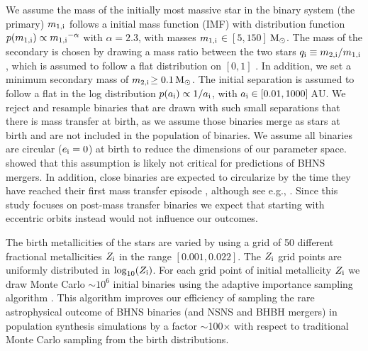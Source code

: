 \documentclass[twocolumn]{aastex63}
\newcommand\bhnsSingle{BHNS\xspace}
\newcommand{\monei}{\ensuremath{m_{1,\rm{i}}}\xspace}
\newcommand{\mtwoi}{\ensuremath{m_{2,\rm{i}}}\xspace}
\newcommand{\ai}{\ensuremath{a_{\rm{i}}}\xspace}
\newcommand{\qi}{\ensuremath{q_{\rm{i}}}\xspace}
\newcommand{\Zi}{\ensuremath{Z_{\rm{i}}}\xspace}
\newcommand{\ei}{\ensuremath{{e}_{\rm{i}}}\xspace}
\newcommand{\Msun}{\ensuremath{\,\rm{M}_{\odot}}\xspace}
\newcommand{\AU}{\ensuremath{\,\mathrm{AU}}\xspace}
\begin{document}
We assume the mass of the initially most massive star in the binary system (the primary) \monei  follows a \citet{2001MNRAS.322..231K} initial mass function (IMF) with distribution function $p(\monei) \propto  {\monei}^{-\alpha}$ with $\alpha = 2.3$, with masses \monei  $\in [5,150]$\Msun. The mass of the secondary is chosen by drawing a  mass ratio between the two stars $\qi \equiv \mtwoi / \monei$, which is assumed to follow a flat distribution
on $[0,1]$  \citep{1991MNRAS.250..701T,1992ApJ...401..265M, 1994A&A...282..801G, 2007ApJ...670..747K, 2012Sci...337..444S, 2014ApJS..213...34K}. In addition, we set a minimum secondary mass of \mtwoi $\geq 0.1\Msun$. The initial separation is assumed to follow a flat in the log distribution $p(\ai) \propto 1 / {\ai}$, with  $\ai \in [0.01, 1000]$\AU \citep{1924PTarO..25f...1O, 1983ARA&A..21..343A}. We reject and resample binaries that are drawn with such small separations that there is mass transfer at birth, as we assume those binaries merge as stars at birth and are not included in the population of binaries. 
We assume all binaries are circular ($\ei =0$) at birth to reduce the dimensions of our parameter space. \citet{2015ApJ...814...58D} showed that this assumption is likely not critical for predictions of \bhnsSingle mergers. In addition,  close binaries are expected to circularize by the time they have reached their first mass transfer episode \citep{1977A&A....57..383Z,1995A&A...296..709V,1999A&A...346...91B,2002MNRAS.329..897H}, although see e.g., \citet{2016ApJ...825...70D}. Since this study focuses on post-mass transfer binaries we expect that starting with eccentric orbits instead would not influence our outcomes. 


The birth metallicities of the stars are varied by using a grid of 50 different fractional metallicities $\Zi$ in the range  $[0.001, 0.022]$. The \Zi grid points are uniformly distributed in $\log_{10}(\Zi)$.
For each grid point of initial metallicity $\Zi$ we draw  Monte Carlo $\sim 10^6$ initial binaries using the adaptive importance sampling algorithm {} \citep{2019MNRAS.490.5228B}. This  algorithm  improves our efficiency of sampling  the rare astrophysical outcome of  \bhnsSingle binaries (and \ac{NSNS} and \ac{BHBH} mergers) in population synthesis simulations by a factor $\sim$100$\times$ with respect to traditional Monte Carlo sampling from the birth distributions. 
\end{document}
